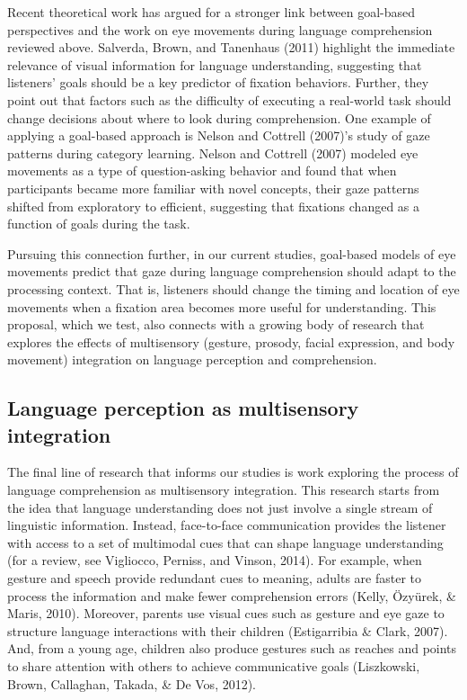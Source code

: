 \documentclass[,man,floatsintext]{apa6}
\begin{document}
Recent theoretical work has argued for a stronger link between
goal-based perspectives and the work on eye movements during language
comprehension reviewed above. Salverda, Brown, and Tanenhaus (2011)
highlight the immediate relevance of visual information for language
understanding, suggesting that listeners' goals should be a key
predictor of fixation behaviors. Further, they point out that factors
such as the difficulty of executing a real-world task should change
decisions about where to look during comprehension. One example of
applying a goal-based approach is Nelson and Cottrell (2007)'s study of
gaze patterns during category learning. Nelson and Cottrell (2007)
modeled eye movements as a type of question-asking behavior and found
that when participants became more familiar with novel concepts, their
gaze patterns shifted from exploratory to efficient, suggesting that
fixations changed as a function of goals during the task.

Pursuing this connection further, in our current studies, goal-based
models of eye movements predict that gaze during language comprehension
should adapt to the processing context. That is, listeners should change
the timing and location of eye movements when a fixation area becomes
more useful for understanding. This proposal, which we test, also
connects with a growing body of research that explores the effects of
multisensory (gesture, prosody, facial expression, and body movement)
integration on language perception and comprehension.

\subsection{Language perception as multisensory
integration}\label{language-perception-as-multisensory-integration}

The final line of research that informs our studies is work exploring
the process of language comprehension as multisensory integration. This
research starts from the idea that language understanding does not just
involve a single stream of linguistic information. Instead, face-to-face
communication provides the listener with access to a set of multimodal
cues that can shape language understanding (for a review, see Vigliocco,
Perniss, and Vinson, 2014). For example, when gesture and speech provide
redundant cues to meaning, adults are faster to process the information
and make fewer comprehension errors (Kelly, Özyürek, \& Maris, 2010).
Moreover, parents use visual cues such as gesture and eye gaze to
structure language interactions with their children (Estigarribia \&
Clark, 2007). And, from a young age, children also produce gestures such
as reaches and points to share attention with others to achieve
communicative goals (Liszkowski, Brown, Callaghan, Takada, \& De Vos,
2012).
\end{document}
